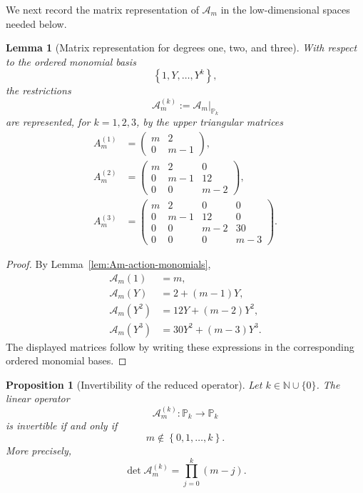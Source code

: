 \documentclass[11pt]{amsart}
\newtheorem{lemma}{Lemma}[section]
\newtheorem{proposition}{Proposition}[section]
\theoremstyle{definition}
\theoremstyle{remark}
\numberwithin{equation}{section}
\newcommand{\set}[1]{\left\{#1\right\}}
\newcommand{\N}{{\mathbb N}}
\begin{document}
We next record the matrix representation of $\mathcal A_m$ in the
low-dimensional spaces needed below.

\begin{lemma}[Matrix representation for degrees one, two, and three]
\label{lem:Am-low-degree-matrices}
With respect to the ordered monomial basis
\[
\set{1,Y,\ldots,Y^k},
\]
the restrictions
\[
\mathcal A_m^{(k)}
:=
\mathcal A_m\big|_{\mathbb P_k}
\]
are represented, for $k=1,2,3$, by the upper triangular matrices
\begin{align}
A_m^{(1)}
&=
\begin{pmatrix}
m & 2\\
0 & m-1
\end{pmatrix},
\label{eq:Am-matrix-k1}
\\
A_m^{(2)}
&=
\begin{pmatrix}
m & 2 & 0\\
0 & m-1 & 12\\
0 & 0 & m-2
\end{pmatrix},
\label{eq:Am-matrix-k2}
\\
A_m^{(3)}
&=
\begin{pmatrix}
m & 2 & 0 & 0\\
0 & m-1 & 12 & 0\\
0 & 0 & m-2 & 30\\
0 & 0 & 0 & m-3
\end{pmatrix}.
\label{eq:Am-matrix-k3}
\end{align}
\end{lemma}

\begin{proof}
By Lemma~\ref{lem:Am-action-monomials},
\begin{align*}
\mathcal A_m(1)
&=
m,
\\
\mathcal A_m(Y)
&=
2+(m-1)Y,
\\
\mathcal A_m(Y^2)
&=
12Y+(m-2)Y^2,
\\
\mathcal A_m(Y^3)
&=
30Y^2+(m-3)Y^3.
\end{align*}
The displayed matrices follow by writing these expressions in the
corresponding ordered monomial bases.
\end{proof}

\begin{proposition}[Invertibility of the reduced operator]
\label{prop:Am-invertibility}
Let $k\in\N\cup\{0\}$. The linear operator
\[
\mathcal A_m^{(k)}
:
\mathbb P_k\longrightarrow\mathbb P_k
\]
is invertible if and only if
\begin{equation}\label{eq:Am-nonresonance}
m\notin\set{0,1,\ldots,k}.
\end{equation}
More precisely,
\begin{equation}\label{eq:det-Am-general}
\det\mathcal A_m^{(k)}
=
\prod_{j=0}^k(m-j).
\end{equation}
\end{proposition}
\end{document}
